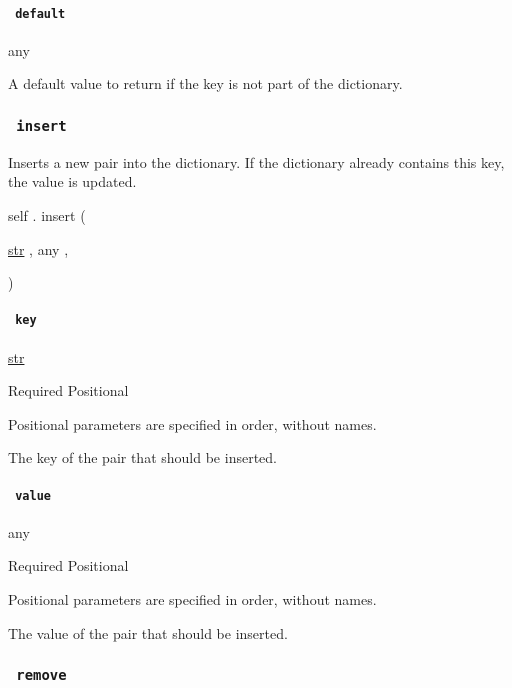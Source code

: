 \paragraph{\texorpdfstring{\texttt{\ default\ }}{ default }}\label{definitions-at-default}

{ any }

A default value to return if the key is not part of the dictionary.

\subsubsection{\texorpdfstring{\texttt{\ insert\ }}{ insert }}\label{definitions-insert}

Inserts a new pair into the dictionary. If the dictionary already
contains this key, the value is updated.

self { . } { insert } (

{ \href{/docs/reference/foundations/str/}{str} , } { { any } , }

)

\paragraph{\texorpdfstring{\texttt{\ key\ }}{ key }}\label{definitions-insert-key}

\href{/docs/reference/foundations/str/}{str}

{Required} {{ Positional }}

\label{definitions-insert-key-positional-tooltip}
Positional parameters are specified in order, without names.

The key of the pair that should be inserted.

\paragraph{\texorpdfstring{\texttt{\ value\ }}{ value }}\label{definitions-insert-value}

{ any }

{Required} {{ Positional }}

\label{definitions-insert-value-positional-tooltip}
Positional parameters are specified in order, without names.

The value of the pair that should be inserted.

\subsubsection{\texorpdfstring{\texttt{\ remove\ }}{ remove }}\label{definitions-remove}

